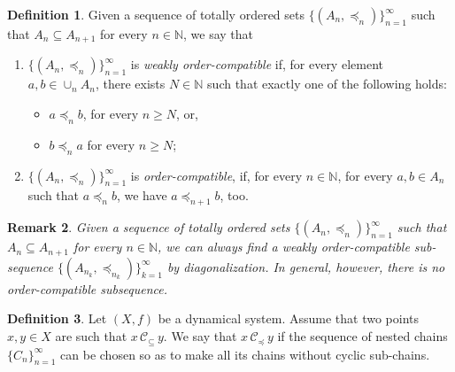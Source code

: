\documentclass[10pt,a4paper]{article}
\theoremstyle{definition}
\newtheorem{defi}{Definition}[section]
\theoremstyle{remark}
\theoremstyle{plain}
\newtheorem{rem}[defi]{Remark}
\begin{document}
\begin{defi}
    Given a sequence of totally ordered sets $\{(A_n,\preceq_n)\}_{n=1}^\infty$ such that $A_n\subseteq A_{n+1}$ for every $n\in\mathbb N$, we say that
    \begin{enumerate}
        \item $\{(A_n,\preceq_n)\}_{n=1}^\infty$ is \emph{weakly order-compatible} if, for every element $a,b\in\cup_nA_n$, there exists $N\in\mathbb N$ such that exactly one of the following holds:
        \begin{itemize}
            \item $a\preceq_nb$, for every $n\ge N$, or,
            \item $b\preceq_na$ for every $n\ge N$;
        \end{itemize}
        \item $\{(A_n,\preceq_n)\}_{n=1}^\infty$ is \emph{order-compatible}, if, for every $n\in\mathbb N$, for every $a,b\in A_n$ such that $a\preceq_nb$, we have $a\preceq_{n+1}b$, too.
    \end{enumerate}
\end{defi}
\begin{rem}\label{diag_}
    Given a sequence of totally ordered sets $\{(A_n,\preceq_n)\}_{n=1}^\infty$ such that $A_n\subseteq A_{n+1}$ for every $n\in\mathbb N$, we can always find a weakly order-compatible sub-sequence $\{(A_{n_k},\preceq_{n_k})\}_{k=1}^\infty$ by  diagonalization. In general, however, there is no order-compatible subsequence.
\end{rem}



\begin{defi}\label{preceq}
    Let $(X,f)$ be a dynamical system.
    Assume that two points $x,y\in X$ are such that $x\,\mathcal{C}_\subseteq\,y$. We say that $x\,\mathcal{C}_\preceq\,y$ if the sequence of nested chains $\{C_n\}_{n=1}^\infty$ can be chosen so as to make all its chains without cyclic sub-chains.
\end{defi}
\end{document}
